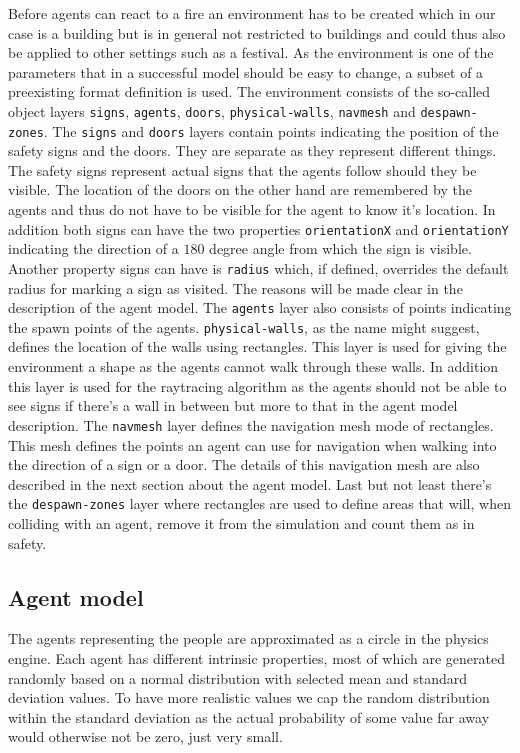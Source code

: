 \documentclass[11pt]{article}
\begin{document}
Before agents can react to a fire an environment has to be created which in our case is a building but is in general not restricted to buildings and could thus also be applied to other settings such as a festival. As the environment is one of the parameters that in a successful model should be easy to change, a subset of a preexisting format definition is used. The environment consists of the so-called object layers \texttt{signs}, \texttt{agents}, \texttt{doors}, \texttt{physical-walls}, \texttt{navmesh} and \texttt{despawn-zones}. The \texttt{signs} and \texttt{doors} layers contain points indicating the position of the safety signs and the doors. They are separate as they represent different things. The safety signs represent actual signs that the agents follow should they be visible. The location of the doors on the other hand are remembered by the agents and thus do not have to be visible for the agent to know it's location. In addition both signs can have the two properties \texttt{orientationX} and \texttt{orientationY} indicating the direction of a $180$ degree angle from which the sign is visible. Another property signs can have is \texttt{radius} which, if defined, overrides the default radius for marking a sign as visited. The reasons will be made clear in the description of the agent model. The \texttt{agents} layer also consists of points indicating the spawn points of the agents. \texttt{physical-walls}, as the name might suggest, defines the location of the walls using rectangles. This layer is used for giving the environment a shape as the agents cannot walk through these walls. In addition this layer is used for the raytracing algorithm as the agents should not be able to see signs if there's a wall in between but more to that in the agent model description. The \texttt{navmesh} layer defines the navigation mesh mode of rectangles. This mesh defines the points an agent can use for navigation when walking into the direction of a sign or a door. The details of this navigation mesh are also described in the next section about the agent model. Last but not least there's the \texttt{despawn-zones} layer where rectangles are used to define areas that will, when colliding with an agent, remove it from the simulation and count them as in safety.

\subsection{Agent model}
The agents representing the people are approximated as a circle in the physics engine. Each agent has different intrinsic properties, most of which are generated randomly based on a normal distribution with selected mean and standard deviation values. To have more realistic values we cap the random distribution within the standard deviation as the actual probability of some value far away would otherwise not be zero, just very small.
\end{document}
